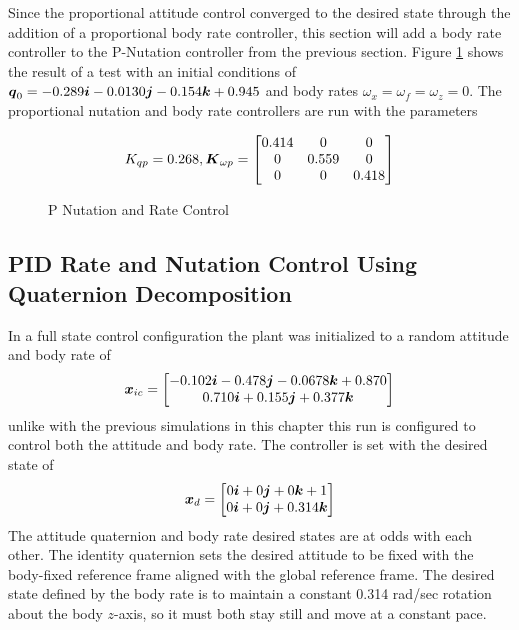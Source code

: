 Since the proportional attitude control converged to the desired state through the addition of a proportional body rate controller, this section will add a body rate controller to the P-Nutation controller from the previous section.  Figure \ref{fig:PNutationRateControl} shows the result of a test with an initial conditions of $\boldsymbol{q}_0 = -0.289\boldsymbol{i} -0.0130 \boldsymbol{j} -0.154 \boldsymbol{k} + 0.945$ and body rates $\omega_x = \omega_f = \omega_z = 0$.  The proportional nutation and body rate controllers are run with the parameters

\begin{equation}
  K_{qp} = 0.268, \boldsymbol{K}_{\omega p} = \begin{bmatrix} 0.414 & 0 & 0 \\ 0 & 0.559 & 0 \\ 0 & 0 & 0.418 \end{bmatrix}
\end{equation}

\begin{figure}[H]
  \centerline{}
  \caption{P Nutation and Rate Control}
  \label{fig:PNutationRateControl}
\end{figure}

\subsection{PID Rate and Nutation Control Using Quaternion Decomposition}
\label{subsec:PIDRateandNutationControl}
In a full state control configuration the plant was initialized to a random attitude and body rate of
\begin{equation}
  \boldsymbol{x}_{ic} = \begin{bmatrix} -0.102 \boldsymbol{i} -0.478 \boldsymbol{j}-0.0678 \boldsymbol{k} + 0.870 \\ 0.710 \boldsymbol{i} + 0.155 \boldsymbol{j} + 0.377 \boldsymbol{k} \end{bmatrix}
\end{equation}
unlike with the previous simulations in this chapter this run is configured to control both the attitude and body rate.  The controller is set with the desired state of
\begin{equation}
  \boldsymbol{x}_d = \begin{bmatrix} 0 \boldsymbol{i} +0 \boldsymbol{j} +0 \boldsymbol{k} + 1 \\ 0 \boldsymbol{i} + 0 \boldsymbol{j} + 0.314 \boldsymbol{k} \end{bmatrix}
\end{equation}
The attitude quaternion and body rate desired states are at odds with each other.  The identity quaternion sets the desired attitude to be fixed with the body-fixed reference frame aligned with the global reference frame.  The desired state defined by the body rate is to maintain a constant 0.314 rad/sec rotation about the body $z$-axis, so it must both stay still and move at a constant pace.

